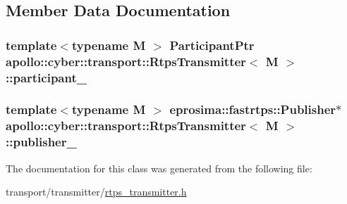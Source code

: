 \subsection{Member Data Documentation}
\hypertarget{classapollo_1_1cyber_1_1transport_1_1RtpsTransmitter_a6f79ba7787f01af33bb5f5b08af0a16c}{
\subsubsection[{participant\-\_\-}]{\setlength{\rightskip}{0pt plus 5cm}template$<$typename M $>$ {\bf Participant\-Ptr} {\bf apollo\-::cyber\-::transport\-::\-Rtps\-Transmitter}$<$ M $>$\-::participant\-\_\-\hspace{0.3cm}{\ttfamily [private]}}}\label{classapollo_1_1cyber_1_1transport_1_1RtpsTransmitter_a6f79ba7787f01af33bb5f5b08af0a16c}
\hypertarget{classapollo_1_1cyber_1_1transport_1_1RtpsTransmitter_a4a5d225edef1b0e744450f1043fa3ab8}{
\subsubsection[{publisher\-\_\-}]{\setlength{\rightskip}{0pt plus 5cm}template$<$typename M $>$ eprosima\-::fastrtps\-::\-Publisher$\ast$ {\bf apollo\-::cyber\-::transport\-::\-Rtps\-Transmitter}$<$ M $>$\-::publisher\-\_\-\hspace{0.3cm}{\ttfamily [private]}}}\label{classapollo_1_1cyber_1_1transport_1_1RtpsTransmitter_a4a5d225edef1b0e744450f1043fa3ab8}


The documentation for this class was generated from the following file\-:\begin{DoxyCompactItemize}
\item 
transport/transmitter/\hyperlink{rtps__transmitter_8h}{rtps\-\_\-transmitter.\-h}\end{DoxyCompactItemize}

